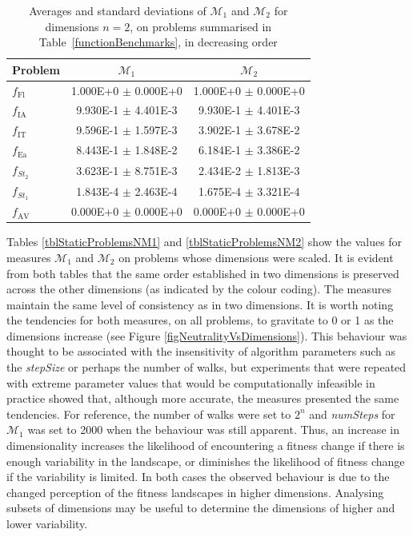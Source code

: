 \documentclass[conference]{IEEEtran}
\begin{document}
\begin{table}[!t] 
	\renewcommand{\arraystretch}{1.3}
	\caption{Averages and standard deviations of ${\mathcal{M}_1}$ and ${\mathcal{M}_2}$ for dimensions $n = 2$, on problems summarised in Table~\ref{functionBenchmarks}, in decreasing order}
	\label{tblStaticProblems2}
	\centering
	\begin{tabular}{|l|c|c|}
		\hline
		\textbf{Problem}					& ${\mathcal{M}_1}$ & ${\mathcal{M}_2}$ \\ \hline				
		$f_{\text{Fl}}$			& 1.000E+0 $\pm$ 0.000E+0 & 1.000E+0 $\pm$ 0.000E+0 \\
		$f_{\text{IA}}$			& 9.930E-1 $\pm$ 4.401E-3 & 9.930E-1 $\pm$ 4.401E-3 \\
		$f_{\text{IT}}$ 		& 9.596E-1 $\pm$ 1.597E-3 & 3.902E-1 $\pm$ 3.678E-2 \\
		$f_{\text{Ea}}$ 		& 8.443E-1 $\pm$ 1.848E-2 & 6.184E-1 $\pm$ 3.386E-2 \\
		$f_{\textit{St}_2}$ 	& 3.623E-1 $\pm$ 8.751E-3 & 2.434E-2 $\pm$ 1.813E-3 \\
		$f_{\textit{St}_1}$ 	& 1.843E-4 $\pm$ 2.463E-4 & 1.675E-4 $\pm$ 3.321E-4 \\
		$f_{\text{AV}}$			& 0.000E+0 $\pm$ 0.000E+0 & 0.000E+0 $\pm$ 0.000E+0 \\  \hline		
	\end{tabular}
\end{table}

Tables \ref{tblStaticProblemsNM1} and \ref{tblStaticProblemsNM2} show the values for measures ${\mathcal{M}_1}$ and ${\mathcal{M}_2}$ on problems whose dimensions were scaled. It is evident from both tables that the same order established in two dimensions is preserved across the other dimensions (as indicated by the colour coding). The measures maintain the same level of consistency as in two dimensions. It is worth noting the tendencies for both measures, on all problems, to gravitate to 0 or 1 as the dimensions increase (see Figure \ref{figNeutralityVsDimensions}). This behaviour was thought to be associated with the insensitivity of algorithm parameters such as the \textit{stepSize} or perhaps the number of walks, but experiments that were repeated with extreme parameter values that would be computationally infeasible in practice showed that, although more accurate, the measures presented the same tendencies. For reference, the number of walks were set to $2^n$ and \textit{numSteps} for ${\mathcal{M}_1}$ was set to 2000 when the behaviour was still apparent. Thus, an increase in dimensionality increases the likelihood of encountering a fitness change if there is enough variability in the landscape, or diminishes the likelihood of fitness change if the variability is limited. In both cases the observed behaviour is due to the changed perception of the fitness landscapes in higher dimensions. Analysing subsets of dimensions may be useful to determine the dimensions of higher and lower variability.
\end{document}
